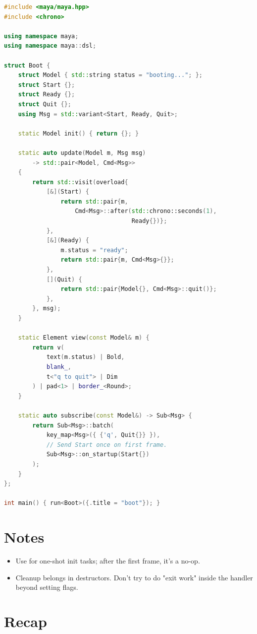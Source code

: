 \begin{lstlisting}[language=C++]
#include <maya/maya.hpp>
#include <chrono>

using namespace maya;
using namespace maya::dsl;

struct Boot {
    struct Model { std::string status = "booting..."; };
    struct Start {};
    struct Ready {};
    struct Quit {};
    using Msg = std::variant<Start, Ready, Quit>;

    static Model init() { return {}; }

    static auto update(Model m, Msg msg)
        -> std::pair<Model, Cmd<Msg>>
    {
        return std::visit(overload{
            [&](Start) {
                return std::pair{m,
                    Cmd<Msg>::after(std::chrono::seconds(1),
                                    Ready{})};
            },
            [&](Ready) {
                m.status = "ready";
                return std::pair{m, Cmd<Msg>{}};
            },
            [](Quit) {
                return std::pair{Model{}, Cmd<Msg>::quit()};
            },
        }, msg);
    }

    static Element view(const Model& m) {
        return v(
            text(m.status) | Bold,
            blank_,
            t<"q to quit"> | Dim
        ) | pad<1> | border_<Round>;
    }

    static auto subscribe(const Model&) -> Sub<Msg> {
        return Sub<Msg>::batch(
            key_map<Msg>({ {'q', Quit{}} }),
            // Send Start once on first frame.
            Sub<Msg>::on_startup(Start{})
        );
    }
};

int main() { run<Boot>({.title = "boot"}); }
\end{lstlisting}

\section{Notes}

\begin{itemize}[leftmargin=*]
  \item Use  for one-shot init tasks;
    after the first frame, it's a no-op.
  \item Cleanup belongs in destructors. Don't try to do
    "exit work" inside the  handler beyond
    setting flags.
\end{itemize}

\section{Recap}

